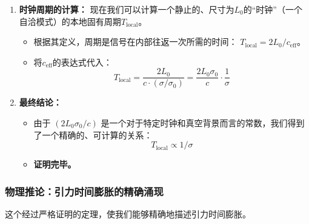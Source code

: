 \documentclass[11pt, a4paper]{article}
\begin{document}
\begin{enumerate}
    \item \textbf{时钟周期的计算：} 现在我们可以计算一个静止的、尺寸为$L_0$的“时钟”（一个自洽模式）的本地固有周期$T_{\text{local}}$。
    \begin{itemize}
        \item 根据其定义，周期是信号在内部往返一次所需的时间： $T_{\text{local}} = 2L_0 / c_{\text{eff}}$。
        \item 将$c_{\text{eff}}$的表达式代入：
        \[
        T_{\text{local}} = \frac{2L_0}{c \cdot (\sigma / \sigma_0)} = \frac{2L_0\sigma_0}{c} \cdot \frac{1}{\sigma}
        \]
    \end{itemize}

    \item \textbf{最终结论：}
    \begin{itemize}
        \item 由于 $(2L_0\sigma_0 / c)$ 是一个对于特定时钟和真空背景而言的常数，我们得到了一个精确的、可计算的关系：
        \[
        T_{\text{local}} \propto 1/\sigma
        \]
        \item \textbf{证明完毕。}
    \end{itemize}
\end{enumerate}

\subsubsection*{物理推论：引力时间膨胀的精确涌现}

这个经过严格证明的定理，使我们能够精确地描述引力时间膨胀。
\end{document}
